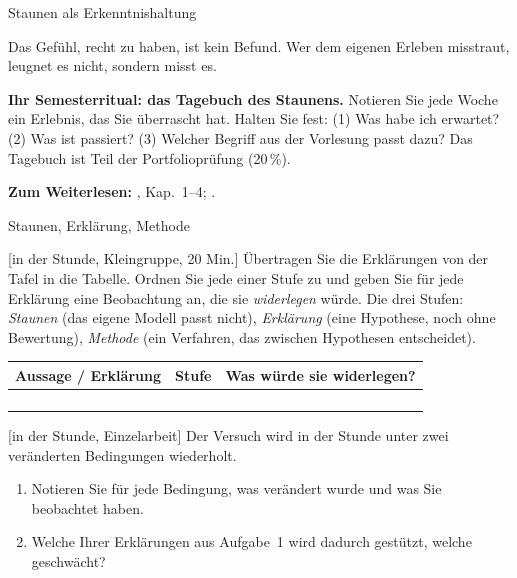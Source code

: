 \begin{handout}{Staunen als Erkenntnishaltung}
\begin{merkbox}
Das Gefühl, recht zu haben, ist kein Befund. Wer dem eigenen Erleben
misstraut, leugnet es nicht, sondern misst es.
\end{merkbox}

\textbf{Ihr Semesterritual: das Tagebuch des Staunens.} Notieren Sie jede
Woche ein Erlebnis, das Sie überrascht hat. Halten Sie fest: (1) Was habe
ich erwartet? (2) Was ist passiert? (3) Welcher Begriff aus der Vorlesung
passt dazu? Das Tagebuch ist Teil der Portfolioprüfung (20\,\%).

\textbf{Zum Weiterlesen:} \textcite{seth2021},
Kap.~1--4; \textcite{keltner2003}.
\end{handout}

\begin{uebungsblatt}{Staunen, Erklärung, Methode}

[in der Stunde, Kleingruppe, 20 Min.]
Übertragen Sie die Erklärungen von der Tafel in die Tabelle. Ordnen Sie
jede einer Stufe zu und geben Sie für jede Erklärung eine Beobachtung an,
die sie \emph{widerlegen} würde. Die drei Stufen: \emph{Staunen} (das
eigene Modell passt nicht), \emph{Erklärung} (eine Hypothese, noch ohne
Bewertung), \emph{Methode} (ein Verfahren, das zwischen Hypothesen
entscheidet).

\begin{center}
\renewcommand{\arraystretch}{2.2}
\begin{tabular}{|p{}|p{}|p{}|}
\hline
\textbf{Aussage / Erklärung} & \textbf{Stufe} & \textbf{Was würde sie widerlegen?} \\
\hline
 & & \\ \hline
 & & \\ \hline
 & & \\ \hline
 & & \\ \hline
\end{tabular}
\end{center}

[in der Stunde, Einzelarbeit]
Der Versuch wird in der Stunde unter zwei veränderten Bedingungen
wiederholt.
\begin{enumerate}
  \item Notieren Sie für jede Bedingung, was verändert wurde und was Sie
    beobachtet haben.
  \item Welche Ihrer Erklärungen aus Aufgabe~1 wird dadurch gestützt,
    welche geschwächt?
\end{enumerate}
\end{uebungsblatt}


